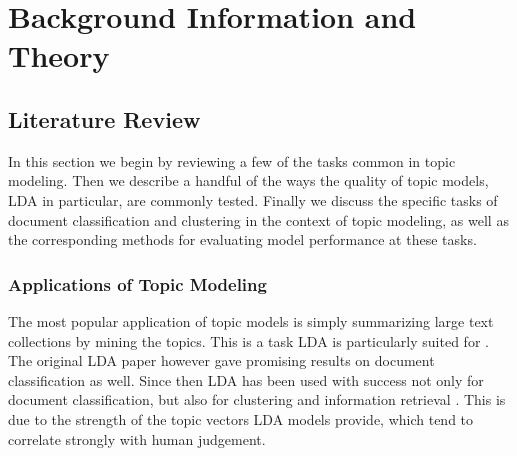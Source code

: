 
\chapter{Background Information and Theory} %

\label{Chapter2} %


\section{Literature Review}

In this section we begin by reviewing a few of the tasks common in topic modeling. Then we describe a handful of the ways the quality of topic models, LDA in particular, are commonly tested. Finally we discuss the specific tasks of document classification and clustering in the context of topic modeling, as well as the corresponding methods for evaluating model performance at these tasks. 

\subsection{Applications of Topic Modeling}
The most popular application of topic models is simply summarizing large text collections by mining the topics. This is a task LDA is particularly suited for \parencite{griffiths_steyvers04, Mei:2007:ALM:1281192.1281246}. The original LDA paper however \parencite{Blei:2003:LDA:944919.944937} gave promising results on document classification as well. Since then LDA has been used with success not only for document classification, but also for clustering and information retrieval \parencite{Wei:2006:LDM:1148170.1148204, Nagwani2015}. This is due to the strength of the topic vectors LDA models provide, which tend to correlate strongly with human judgement. 


